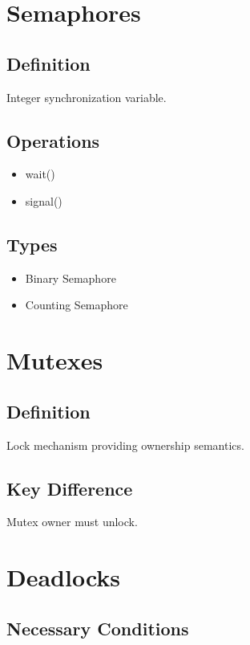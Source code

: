 \section{Semaphores}

\subsection*{Definition}

Integer synchronization variable.

\subsection*{Operations}

\begin{itemize}
\item wait()
\item signal()
\end{itemize}

\subsection*{Types}

\begin{itemize}
\item Binary Semaphore
\item Counting Semaphore
\end{itemize}

\section{Mutexes}

\subsection*{Definition}

Lock mechanism providing ownership semantics.

\subsection*{Key Difference}

Mutex owner must unlock.

\section{Deadlocks}

\subsection*{Necessary Conditions}

